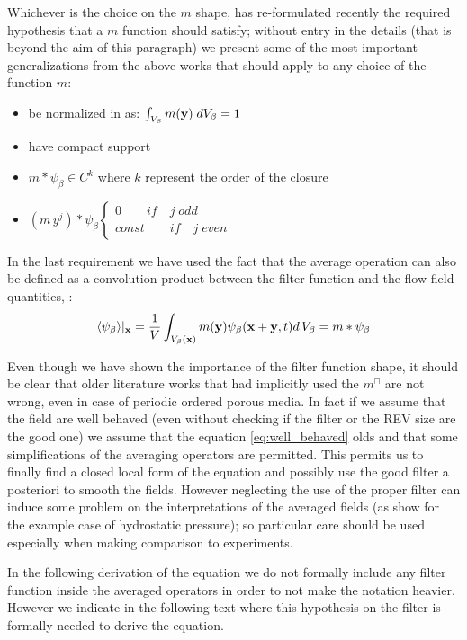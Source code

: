 Whichever is the choice on the $m$ shape, \citet{davit2017technical} has re-formulated recently the required hypothesis that a $m$ function should satisfy; without entry in the details (that is beyond the aim of this paragraph) we present some of the most important generalizations from the above works that should apply to any choice of the function $m$:
\begin{itemize}
	\item be normalized in as: $\int_{V_\beta}  m(\mathbf{y}) \; dV_\beta = 1$
	\item have compact support 
	\item $m*\psi_{\beta} \in C^{k}$ where $k$ represent the order of the closure
	\item $(m \, y^j)*\psi_{\beta}
	\begin{cases}
	0 \qquad if \quad j \; odd\\
	const  \qquad if \quad j \; even
	\end{cases}$
\end{itemize}

In the last requirement we have used the fact that the average operation can also be defined as a convolution product between the filter function and the flow field quantities, \citet{marle1982macroscopic}:
$$
{\left< \psi_{\beta} \right>}|_{\mathbf{x}} = \dfrac{1}{V} \int_{V_\beta(\mathbf{x})} m(\mathbf{y}) \psi_{\beta}(\mathbf{x}+\mathbf{y}, t) d \, V_\beta = m*\psi_{\beta}
$$

Even though we have shown the importance of the filter function shape, it should be clear that older literature works that had implicitly used the $m^{\sqcap}$ are not wrong, even in case of periodic ordered porous media.
In fact if we assume that the field are well behaved (even without checking if the filter or the REV size are the good one) we assume that the equation \eqref{eq:well_behaved} olds and that some simplifications of the averaging operators are permitted.
This permits us to finally find a closed local form of the equation and possibly use the good filter a posteriori to smooth the fields.
However neglecting the use of the proper filter can induce some problem on the interpretations of the averaged fields (as \citet{quintard1994transport1} show for the example case of hydrostatic pressure); so particular care should be used especially when making comparison to experiments.

In the following derivation of the equation we do not formally include any filter function inside the averaged operators in order to not make the notation heavier.
However we indicate in the following text where this hypothesis on the filter is formally needed to derive the equation.

